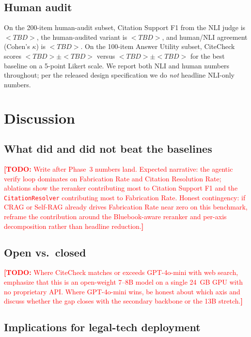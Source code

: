 \documentclass[11pt]{article}
\newcommand{\todo}[1]{\textcolor{red}{\textbf{[TODO:} #1\textbf{]}}}
\begin{document}
\subsection{Human audit}
\label{sec:results:audit}

On the 200-item human-audit subset, Citation Support F1 from the NLI
judge is $<TBD>$, the human-audited variant is $<TBD>$, and
human/NLI agreement (Cohen's $\kappa$) is $<TBD>$. On the 100-item
Answer Utility subset, CiteCheck scores $<TBD> \pm <TBD>$ versus
$<TBD> \pm <TBD>$ for the best baseline on a 5-point Likert scale.
We report both NLI and human numbers throughout; per the released
design specification we do \emph{not} headline NLI-only numbers.

\section{Discussion}
\label{sec:discussion}

\subsection{What did and did not beat the baselines}
\label{sec:discussion:results}

\todo{Write after Phase~3 numbers land. Expected narrative: the
agentic verify loop dominates on Fabrication Rate and Citation
Resolution Rate; ablations show the reranker contributing most to
Citation Support F1 and the \texttt{CitationResolver} contributing
most to Fabrication Rate. Honest contingency: if CRAG or Self-RAG
already drives Fabrication Rate near zero on this benchmark, reframe
the contribution around the Bluebook-aware reranker and per-axis
decomposition rather than headline reduction.}

\subsection{Open vs.\ closed}
\label{sec:discussion:openclosed}

\todo{Where CiteCheck matches or exceeds GPT-4o-mini with web search,
emphasize that this is an open-weight 7--8B model on a single 24~GB
GPU with no proprietary API. Where GPT-4o-mini wins, be honest about
which axis and discuss whether the gap closes with the secondary
backbone or the 13B stretch.}

\subsection{Implications for legal-tech deployment}
\label{sec:discussion:deployment}
\end{document}
